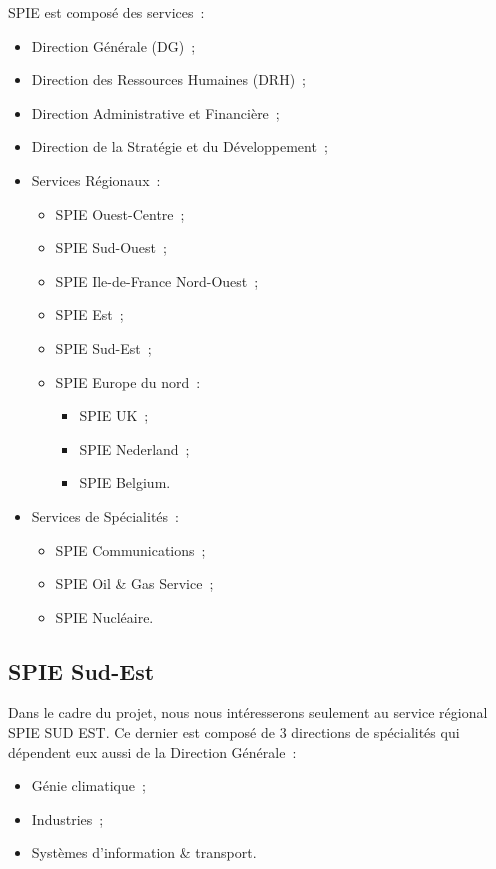 SPIE est composé des services~:

\begin{itemize}
    \item Direction Générale (DG)~;
    \item Direction des Ressources Humaines (DRH)~;
    \item Direction Administrative et Financière~;
    \item Direction de la Stratégie et du Développement~;
    \item Services Régionaux~:
    \begin{itemize}
        \item SPIE Ouest-Centre~;
        \item SPIE Sud-Ouest~;
        \item SPIE Ile-de-France Nord-Ouest~;
        \item SPIE Est~;
        \item SPIE Sud-Est~;
        \item SPIE Europe du nord~:
        \begin{itemize}
            \item SPIE UK~;
            \item SPIE Nederland~;
            \item SPIE Belgium.
        \end{itemize}
    \end{itemize}
    \item Services de Spécialités~:
    \begin{itemize}
        \item SPIE Communications~;
        \item SPIE Oil \& Gas Service~;
        \item SPIE Nucléaire.
    \end{itemize}
\end{itemize}

\subsection{SPIE Sud-Est}

Dans le cadre du projet, nous nous intéresserons seulement au service régional SPIE SUD EST. Ce dernier
est composé de 3 directions de spécialités qui dépendent eux aussi de la Direction Générale~:

\begin{itemize}
    \item Génie climatique~;
    \item Industries~;
    \item Systèmes d’information \& transport.
\end{itemize}


